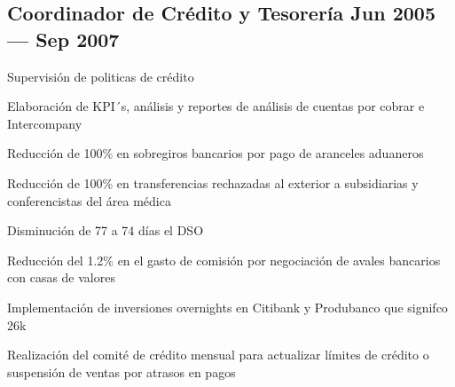 \subsection{\texorpdfstring{Coordinador de Crédito y Tesorería \hfill Jun 2005 --- Sep 2007}{Coordinador de Crédito y Tesorería Jun 2005 --- Sep 2007}}
\begin{zitemize}
\item Supervisión de politicas de crédito
\item Elaboración de KPI´s, análisis  y reportes de análisis de cuentas por cobrar e Intercompany
\item Reducción de 100\%  en sobregiros bancarios por pago de aranceles aduaneros
\item Reducción de 100\% en transferencias rechazadas al exterior a subsidiarias y conferencistas del área médica
\item Disminución de 77 a 74 días el DSO 
\item Reducción del 1.2\% en el gasto de comisión por negociación de avales bancarios con casas de valores
\item Implementación de inversiones overnights en Citibank y Produbanco que signifco 26k
\item Realización del comité de crédito mensual para actualizar límites de crédito o suspensión de ventas por atrasos en pagos
\end{zitemize}



